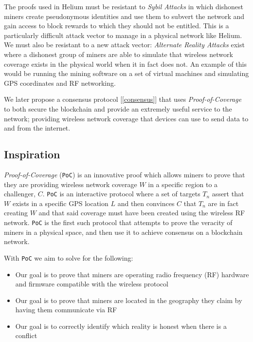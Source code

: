 \documentclass[letterpaper,11pt]{article}
\begin{document}
The proofs used in Helium must be resistant to \emph{Sybil Attacks} in which dishonest miners create pseudonymous identities and use them to subvert the network and gain access to block rewards to which they should not be entitled. This is a particularly difficult attack vector to manage in a physical network like Helium. We must also be resistant to a new attack vector: \emph{Alternate Reality Attacks} exist where a dishonest group of miners are able to simulate that wireless network coverage exists in the physical world when it in fact does not. An example of this would be running the mining software on a set of virtual machines and simulating GPS coordinates and RF networking.

We later propose a consensus protocol [\ref{consensus}] that uses \emph{Proof-of-Coverage} to both secure the blockchain and provide an extremely useful service to the network; providing wireless network coverage that devices can use to send data to and from the internet.

\subsection{Inspiration}

\emph{Proof-of-Coverage} (\verb|PoC|) is an innovative proof which allows miners to prove that they are providing wireless network coverage $W$ in a specific region to a challenger, $C$. \verb|PoC| is an interactive protocol where a set of targets $T_n$ assert that $W$ exists in a specific GPS location $L$ and then convinces $C$ that $T_n$ are in fact creating $W$ and that said coverage must have been created using the wireless RF network. \verb|PoC| is the first such protocol that attempts to prove the veracity of miners in a physical space, and then use it to achieve consensus on a blockchain network.

With \verb|PoC| we aim to solve for the following:

\begin{itemize}
    \item Our goal is to prove that miners are operating radio frequency (RF) hardware and firmware compatible with the wireless protocol
    \item Our goal is to prove that miners are located in the geography they claim by having them communicate via RF
    \item Our goal is to correctly identify which reality is honest when there is a conflict
\end{itemize}
\end{document}
